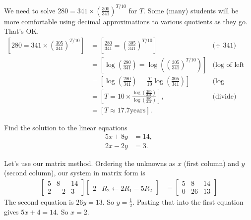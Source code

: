 \documentclass[12pt,fleqn,answers]{exam}
\begin{document}
\begin{questions}
\begin{parts}
\begin{solution}%
   We need to solve $280 = 341 \times \left(\frac{305}{341} \right)^{T/10}$ for $T$. Some (many) students will be more comfortable
   using decimal approximations to various quotients as they go. That's OK.
   \begin{align*}
   \left[280 = 341 \times \left(\frac{305}{341} \right)^{T/10} \right] &=
   \left[\frac{280}{341} = \left(\frac{305}{341} \right)^{T/10} \right] &\mbox{($\div$ 341)} \\
   &= \left[\log(\frac{280}{341}) = \log \left(\left(\frac{305}{341} \right)^{T/10} \right) \right] &\mbox{(log of left and right)} \\
   &= \left[\log \left (\frac{280}{341} \right) = \frac{T}{10} \log \left(\frac{305}{341}  \right) \right] &\mbox{(log property)} \\
   &= \left[T = 10 \times \frac{\log \left (\frac{280}{341} \right)}{\log \left(\frac{305}{341} \right)} \right], &\mbox{(divide)} \\
   &= \left[T \approx 17.7 \mbox{years} \right]. 
   \end{align*}

\end{solution}

\end{parts}



\question [2]  Find the solution to the linear equations
\begin{align*}
   5 x + 8 y &= 14, \\
   2 x - 2 y &= 3.
\end{align*}

\begin{solution}[3.0in] Let's use our matrix method. Ordering the unknowns as $x$  (first column) and $y$ (second column), 
   our system in matrix form is
   \begin{align*}
       \begin{bmatrix} 5 & 8 & 14 \\ 2 & -2 & 3 \end{bmatrix}
       \begin{bmatrix}  \\ 2 & R_2 \leftarrow 2 R_1 - 5 R_2 \end{bmatrix}
       &= \begin{bmatrix} 5 & 8 & 14 \\ 0 & 26 & 13 \end{bmatrix}
   \end{align*}
   The second equation is $26 y = 13$. So $y=\frac{1}{2}$. Pasting that into the 
   first equation gives $5 x + 4 = 14$. So $x =2$. 


\end{solution}
\end{questions}
\end{document}
